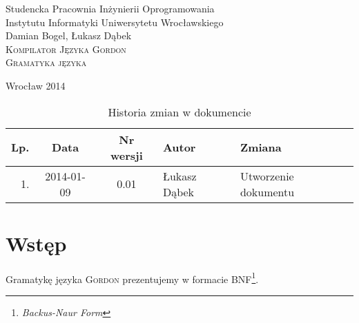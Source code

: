 \documentclass{documentation}
\begin{document}
\begin{titlepage}
\begin{center}
Studencka Pracownia Inżynierii Oprogramowania\\
Instytutu Informatyki Uniwersytetu Wrocławskiego\\[6cm]

Damian Bogel, Łukasz Dąbek\\[1cm]
\textsc{\LARGE Kompilator Języka Gordon}\\[0.5cm]
\textsc{\large Gramatyka języka}

\vfill
Wrocław 2014 \\[2.5cm]

\end{center}
\end{titlepage}

\newpage
\begin{table}
	\centering
    \captionsetup{name=Tabela,labelsep=period}
	\caption{Historia zmian w dokumencie}
		\begin{tabular}{|r|c|c|l|l|}
		\hline
		Lp.  & Data       & Nr wersji & Autor                 & Zmiana \\ \hline
		1.   & 2014-01-09 & 0.01 & Łukasz Dąbek & Utworzenie dokumentu \\ \hline
	\end{tabular}
\end{table}
\newpage

\tableofcontents
\setcounter{page}{2}

\newpage

\section{Wstęp}
Gramatykę języka \textsc{Gordon} prezentujemy w formacie BNF\footnote{\emph{Backus-Naur Form}}.
\end{document}
